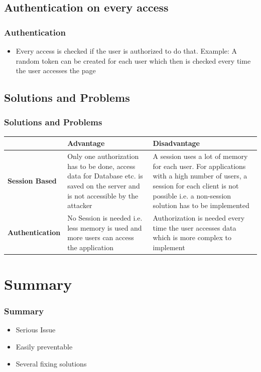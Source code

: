 \documentclass[aspectratio=169]{beamer}
\begin{document}
\subsection{Authentication on every access}

\begin{frame}
  \frametitle{Authentication}
  \begin{itemize}
    \item Every access is checked if the user is authorized to do that. Example: A random token can be created for each user which then is checked every time the user accesses the page
  \end{itemize}
\end{frame}

\subsection{Solutions and Problems}

\begin{frame}
  \frametitle{Solutions and Problems}
\tiny
  \begin{tabular}{|l|p{4cm}|p{4cm}|}
    \hline
    & \textbf{Advantage} & \textbf{Disadvantage} \\\hline
    \textbf{Session Based} & Only one authorization has to be done, access data for Database etc. is saved on the server and is not accessible by the attacker & A session uses a lot of memory for each user. For applications with a high number of users, a session for each client is not possible i.e. a non-session solution has to be implemented \\\hline
    \textbf{Authentication} & No Session is needed i.e. less memory is used and more users can access the application & Authorization is needed every time the user accesses data which is more complex to implement\\\hline
  \end{tabular}
\end{frame}


\section{Summary}

\begin{frame}
  \frametitle{Summary}
  \begin{itemize}
    \item Serious Issue
    \item Easily preventable
    \item Several fixing solutions
  \end{itemize}
\end{frame}
\end{document}
